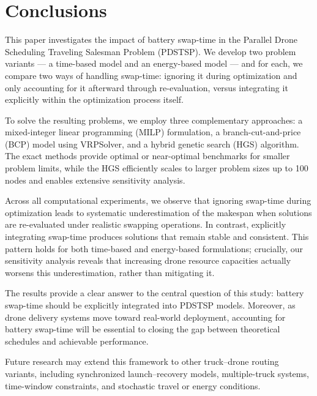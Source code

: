\documentclass[3p, authoryear, 11pt]{elsarticle}
\begin{document}
\section{Conclusions}
\label{sec:conclusions}

This paper investigates the impact of battery swap-time in the Parallel Drone Scheduling Traveling Salesman Problem (PDSTSP).
We develop two problem variants --- a time-based model and an energy-based model --- and for each, we compare two ways of handling swap-time: ignoring it during optimization and only accounting for it afterward through re-evaluation, versus integrating it explicitly within the optimization process itself.

To solve the resulting problems, we employ three complementary approaches:
a mixed-integer linear programming (MILP) formulation,
a branch-cut-and-price (BCP) model using VRPSolver,
and a hybrid genetic search (HGS) algorithm.
The exact methods provide optimal or near-optimal benchmarks for smaller problem limits,
while the HGS efficiently scales to larger problem sizes up to 100 nodes and enables extensive sensitivity analysis.

Across all computational experiments, we observe that ignoring swap-time during optimization leads to systematic underestimation of the makespan when solutions are re-evaluated under realistic swapping operations.
In contrast, explicitly integrating swap-time produces solutions that remain stable and consistent.
This pattern holds for both time-based and energy-based formulations; crucially, our sensitivity analysis reveals that increasing drone resource capacities actually worsens this underestimation, rather than mitigating it.

The results provide a clear answer to the central question of this study:
battery swap-time should be explicitly integrated into PDSTSP models.
Moreover, as drone delivery systems move toward real-world deployment, accounting for battery swap-time will be essential to closing the gap between theoretical schedules and achievable performance.

Future research may extend this framework to other truck–drone routing variants, including synchronized launch–recovery models, multiple-truck systems, time-window constraints, and stochastic travel or energy conditions.



\end{document}
